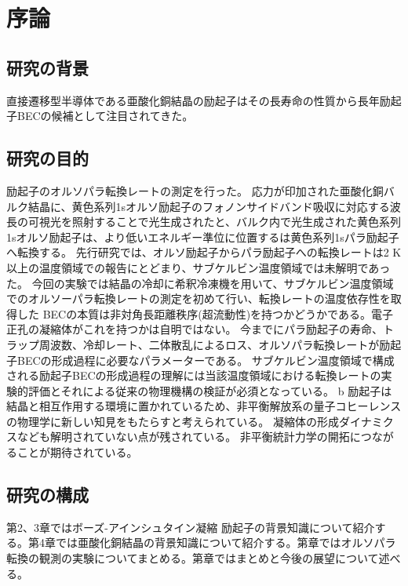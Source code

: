 \newpage
\section{序論}
\renewcommand{\thefigure}{\thesection-\arabic{figure}}
\subsection{研究の背景}
直接遷移型半導体である亜酸化銅結晶の励起子はその長寿命の性質から長年励起子BECの候補として注目されてきた。
\subsection{研究の目的}
励起子のオルソパラ転換レートの測定を行った。
応力が印加された亜酸化銅バルク結晶に、黄色系列1sオルソ励起子のフォノンサイドバンド吸収に対応する波長の可視光を照射することで光生成されたと、バルク内で光生成された黄色系列1sオルソ励起子は、より低いエネルギー準位に位置するは黄色系列1sパラ励起子へ転換する。
先行研究では、オルソ励起子からパラ励起子への転換レートは2 K以上の温度領域での報告にとどまり、サブケルビン温度領域では未解明であった。
今回の実験では結晶の冷却に希釈冷凍機を用いて、サブケルビン温度領域でのオルソーパラ転換レートの測定を初めて行い、転換レートの温度依存性を取得した
BECの本質は非対角長距離秩序(超流動性)を持つかどうかである。電子正孔の凝縮体がこれを持つかは自明ではない。
今までにパラ励起子の寿命、トラップ周波数、冷却レート、二体散乱によるロス、オルソパラ転換レートが励起子BECの形成過程に必要なパラメーターである。
サブケルビン温度領域で構成される励起子BECの形成過程の理解には当該温度領域における転換レートの実験的評価とそれによる従来の物理機構の検証が必須となっている。
b
励起子は結晶と相互作用する環境に置かれているため、非平衡解放系の量子コヒーレンスの物理学に新しい知見をもたらすと考えられている。
凝縮体の形成ダイナミクスなども解明されていない点が残されている。
非平衡統計力学の開拓につながることが期待されている。
\subsection{研究の構成}
第2、3章ではボーズ-アインシュタイン凝縮
励起子の背景知識について紹介する。第4章では亜酸化銅結晶の背景知識について紹介する。第章ではオルソパラ転換の観測の実験についてまとめる。第章ではまとめと今後の展望について述べる。
